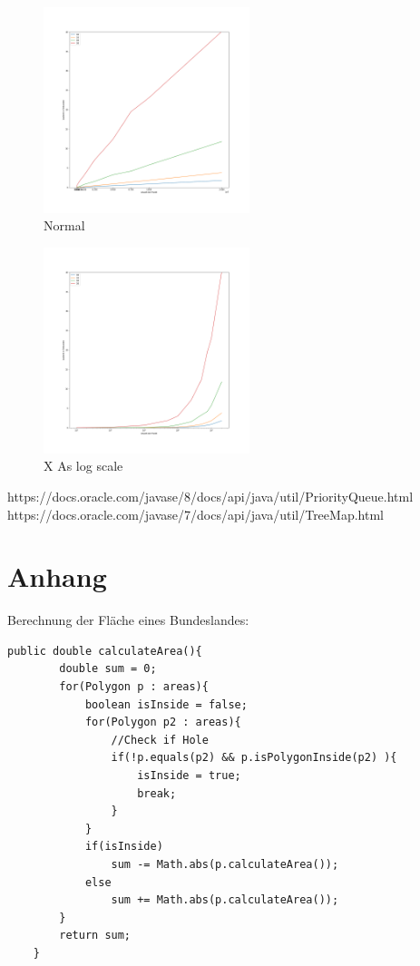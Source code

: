 \documentclass[conference]{IEEEtran}
\begin{document}
	\begin{figure}[h]
		\begin{center}
			\includegraphics[width=6cm]{index.png}
			\caption{Normal}
			\label{figure_1}
		\end{center}
	\end{figure}
	\begin{figure}[h]
		\begin{center}
			\includegraphics[width=6cm]{index2.png}
			\caption{X As log scale}
			\label{figure_2}
		\end{center}
	\end{figure}
	
	
	\begin{thebibliography}{00}
		https://docs.oracle.com/javase/8/docs/api/java/util/PriorityQueue.html
		https://docs.oracle.com/javase/7/docs/api/java/util/TreeMap.html
	\end{thebibliography}
	
	
	
	\section{Anhang}

	Berechnung der Fläche eines Bundeslandes:
	\begin{lstlisting}[basicstyle=\tiny]
	public double calculateArea(){
		double sum = 0;
		for(Polygon p : areas){
			boolean isInside = false;
			for(Polygon p2 : areas){
				//Check if Hole
				if(!p.equals(p2) && p.isPolygonInside(p2) ){ 
					isInside = true;
					break;
				}   
			}
			if(isInside)
				sum -= Math.abs(p.calculateArea());
			else
				sum += Math.abs(p.calculateArea());
		}
		return sum;
	}
	\end{lstlisting}	
\end{document}
